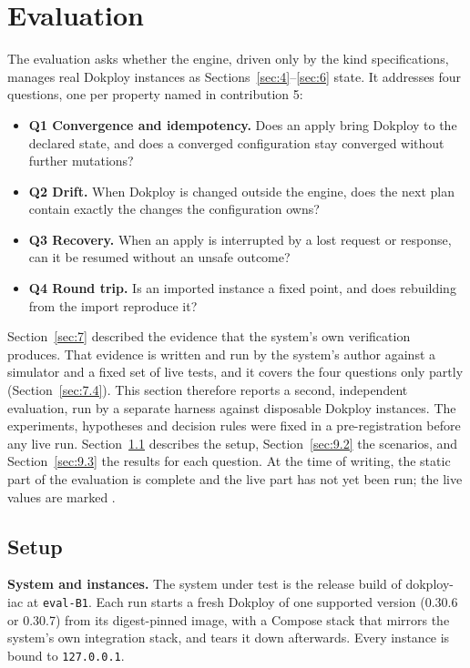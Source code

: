 \section{Evaluation}\label{sec:9}

The evaluation asks whether the engine, driven only by the kind specifications, manages real Dokploy
instances as Sections~\ref{sec:4}--\ref{sec:6} state. It addresses four questions, one per property named in contribution 5:

\begin{itemize}
\item
  \textbf{Q1 Convergence and idempotency.} Does an apply bring Dokploy to the declared state, and does a
  converged configuration stay converged without further mutations?
\item
  \textbf{Q2 Drift.} When Dokploy is changed outside the engine, does the next plan contain exactly the
  changes the configuration owns?
\item
  \textbf{Q3 Recovery.} When an apply is interrupted by a lost request or response, can it be resumed
  without an unsafe outcome?
\item
  \textbf{Q4 Round trip.} Is an imported instance a fixed point, and does rebuilding from the import
  reproduce it?
\end{itemize}

Section~\ref{sec:7} described the evidence that the system's own verification produces. That evidence is
written and run by the system's author against a simulator and a fixed set of live tests, and it
covers the four questions only partly (Section~\ref{sec:7.4}). This section therefore reports a second,
independent evaluation, run by a separate harness against disposable Dokploy instances. The
experiments, hypotheses and decision rules were fixed in a pre-registration before any live run.
Section~\ref{sec:9.1} describes the setup, Section~\ref{sec:9.2} the scenarios, and Section~\ref{sec:9.3} the results for each
question. At the time of writing, the static part of the evaluation is complete and the live
part has not yet been run; the live values are marked \result{}.

\subsection{Setup}\label{sec:9.1}

\textbf{System and instances.} The system under test is the release build of dokploy-iac at \texttt{eval-B1}. Each
run starts a fresh Dokploy of one supported version (0.30.6 or 0.30.7) from its digest-pinned image,
with a Compose stack that mirrors the system's own integration stack, and tears it down afterwards. Every instance is bound to
\texttt{127.0.0.1}.

